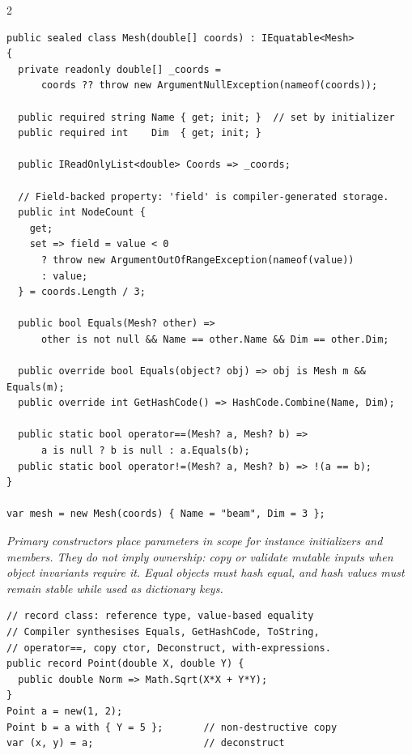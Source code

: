 \documentclass[9pt,a4paper]{extarticle}
\newenvironment{card}[3][acBlue]{%
  \begin{tcolorbox}[
    enhanced, colback=#2, colframe=bdCard,
    coltitle=black, colbacktitle=#2!70!bgHdr,
    fonttitle=\bfseries\fontsize{6.16pt}{7.48pt}\selectfont\MakeUppercase,
    title={#3},
    left=3pt, right=2pt, top=1.4pt, bottom=1.8pt,
    toptitle=1pt, bottomtitle=1pt,
    boxrule=0.4pt,
    borderline west={3pt}{0pt}{#1},
    arc=2pt, before skip=0pt, after skip=1.6mm,
    breakable, toprule at break=0pt, bottomrule at break=0pt,
  ]}{\end{tcolorbox}}
\newcommand{\note}[1]{\par\noindent
  \begin{minipage}{\linewidth}%
  {\fontsize{5.6pt}{6.8pt}\selectfont\itshape #1}%
  \end{minipage}\par}
\begin{document}
\begin{multicols}{2}

\begin{card}[acBlue]{bgBlue}{Class --- Modern Numerical Style}
\begin{lstlisting}[style=cs]
public sealed class Mesh(double[] coords) : IEquatable<Mesh>
{
  private readonly double[] _coords =
      coords ?? throw new ArgumentNullException(nameof(coords));

  public required string Name { get; init; }  // set by initializer
  public required int    Dim  { get; init; }

  public IReadOnlyList<double> Coords => _coords;

  // Field-backed property: 'field' is compiler-generated storage.
  public int NodeCount {
    get;
    set => field = value < 0
      ? throw new ArgumentOutOfRangeException(nameof(value))
      : value;
  } = coords.Length / 3;

  public bool Equals(Mesh? other) =>
      other is not null && Name == other.Name && Dim == other.Dim;

  public override bool Equals(object? obj) => obj is Mesh m && Equals(m);
  public override int GetHashCode() => HashCode.Combine(Name, Dim);

  public static bool operator==(Mesh? a, Mesh? b) =>
      a is null ? b is null : a.Equals(b);
  public static bool operator!=(Mesh? a, Mesh? b) => !(a == b);
}

var mesh = new Mesh(coords) { Name = "beam", Dim = 3 };
\end{lstlisting}
\note{Primary constructors place parameters in scope for instance initializers
and members. They do not imply ownership: copy or validate mutable inputs when
object invariants require it. Equal objects must hash equal, and hash values
must remain stable while used as dictionary keys.}
\end{card}

\begin{card}[acTeal]{bgTeal}{Records \& Operator Overloading}
\begin{lstlisting}[style=cs]
// record class: reference type, value-based equality
// Compiler synthesises Equals, GetHashCode, ToString,
// operator==, copy ctor, Deconstruct, with-expressions.
public record Point(double X, double Y) {
  public double Norm => Math.Sqrt(X*X + Y*Y);
}
Point a = new(1, 2);
Point b = a with { Y = 5 };       // non-destructive copy
var (x, y) = a;                   // deconstruct


\end{lstlisting}
\end{card}
\end{multicols}
\end{document}
